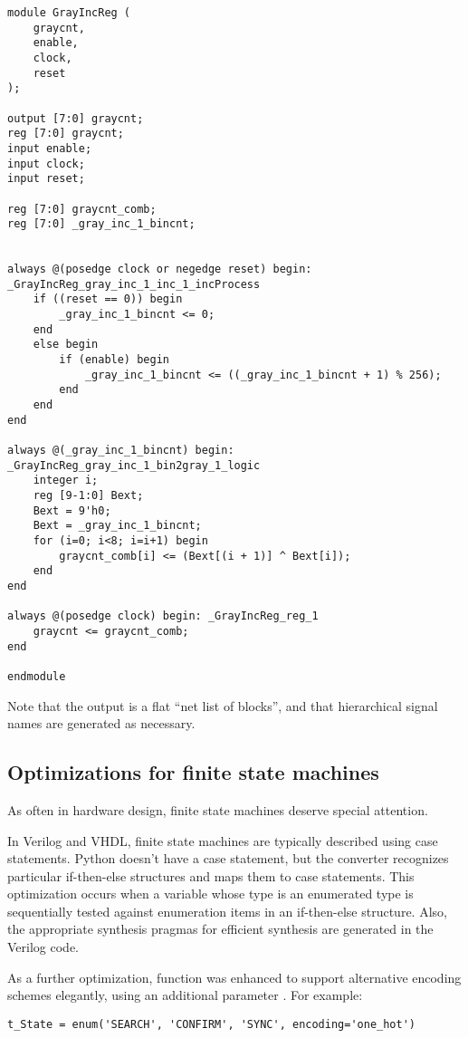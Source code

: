 \begin{verbatim}
module GrayIncReg (
    graycnt,
    enable,
    clock,
    reset
);
 
output [7:0] graycnt;
reg [7:0] graycnt;
input enable;
input clock;
input reset;
 
reg [7:0] graycnt_comb;
reg [7:0] _gray_inc_1_bincnt;
 
 
always @(posedge clock or negedge reset) begin: _GrayIncReg_gray_inc_1_inc_1_incProcess
    if ((reset == 0)) begin
        _gray_inc_1_bincnt <= 0;
    end
    else begin
        if (enable) begin
            _gray_inc_1_bincnt <= ((_gray_inc_1_bincnt + 1) % 256);
        end
    end
end
 
always @(_gray_inc_1_bincnt) begin: _GrayIncReg_gray_inc_1_bin2gray_1_logic
    integer i;
    reg [9-1:0] Bext;
    Bext = 9'h0;
    Bext = _gray_inc_1_bincnt;
    for (i=0; i<8; i=i+1) begin
        graycnt_comb[i] <= (Bext[(i + 1)] ^ Bext[i]);
    end
end
 
always @(posedge clock) begin: _GrayIncReg_reg_1
    graycnt <= graycnt_comb;
end
 
endmodule
\end{verbatim}

Note that the output is a flat ``net list of blocks'', and
that hierarchical signal names are generated as necessary.

\subsection{Optimizations for finite state machines\label{conv-usage-fsm}}
As often in hardware design, finite state machines deserve special attention.

In Verilog and VHDL, finite state machines are typically described
using case statements.  Python doesn't have a case statement, but the
converter recognizes particular if-then-else structures and maps them
to case statements. This optimization occurs when a variable whose
type is an enumerated type is sequentially tested against enumeration
items in an if-then-else structure. Also, the appropriate synthesis
pragmas for efficient synthesis are generated in the Verilog code.

As a further optimization, function  was enhanced to support
alternative encoding schemes elegantly, using an additional parameter
. For example:

\begin{verbatim}
t_State = enum('SEARCH', 'CONFIRM', 'SYNC', encoding='one_hot')
\end{verbatim}

